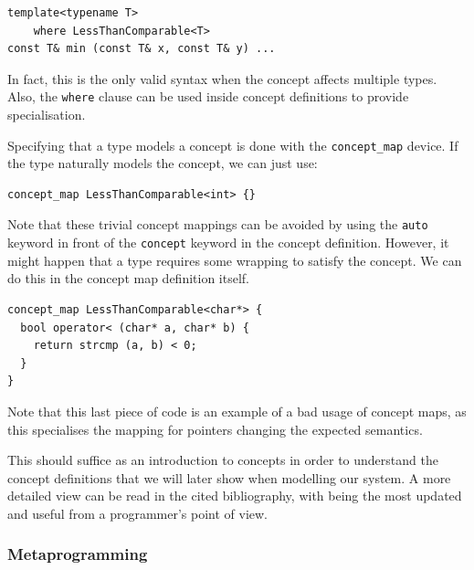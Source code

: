 \begin{lstlisting}
template<typename T>
    where LessThanComparable<T>
const T& min (const T& x, const T& y) ...
\end{lstlisting}

In fact, this is the only valid syntax when the concept affects
multiple types. Also, the \texttt{where} clause can be used inside
concept definitions to provide specialisation.

Specifying that a type models a concept is done with the
\texttt{concept\_map} device. If the type naturally models the
concept, we can just use:

\begin{lstlisting}
concept_map LessThanComparable<int> {}
\end{lstlisting}

Note that these trivial concept mappings can be avoided by using the
\texttt{auto} keyword in front of the \texttt{concept} keyword in the
concept definition. However, it might happen that a type requires some
wrapping to satisfy the concept. We can do this in the concept map
definition itself.

\begin{lstlisting}
concept_map LessThanComparable<char*> {
  bool operator< (char* a, char* b) {
    return strcmp (a, b) < 0;
  }
}
\end{lstlisting}

Note that this last piece of code is an example of a bad usage of
concept maps, as this specialises the mapping for pointers changing
the expected semantics.

This should suffice as an introduction to concepts in order to
understand the concept definitions that we will later show when
modelling our system. A more detailed view can be read in the cited
bibliography, with \cite{jarvi10concept} being the most updated and
useful from a programmer's point of view.

\subsubsection{Metaprogramming}

